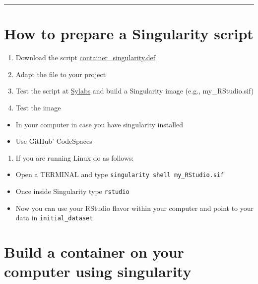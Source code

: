 \documentclass[
  12pt,
]{article}
\providecommand{\tightlist}{%
  \setlength{\itemsep}{0pt}\setlength{\parskip}{0pt}}
\begin{document}
\begin{center}\rule{0.5\linewidth}{0.5pt}\end{center}

\hypertarget{how-to-prepare-a-singularity-script}{%
\section{How to prepare a Singularity
script}\label{how-to-prepare-a-singularity-script}}

\begin{enumerate}
\def\labelenumi{\arabic{enumi}.}
\item
  Download the script
  \href{https://github.com/reisportela/R_Training/tree/master/_containers/container_singularity.def}{container\_singularity.def}
\item
  Adapt the file to your project
\item
  Test the script at \href{https://cloud.sylabs.io/}{Sylabs} and build a
  Singularity image (e.g., my\_RStudio.sif)
\item
  Test the image
\end{enumerate}

\begin{itemize}
\item
  In your computer in case you have singularity installed
\item
  Use GitHub' CodeSpaces
\end{itemize}

\begin{enumerate}
\def\labelenumi{\arabic{enumi}.}
\setcounter{enumi}{5}
\tightlist
\item
  If you are running Linux do as follows:
\end{enumerate}

\begin{itemize}
\item
  Open a TERMINAL and type \texttt{singularity\ shell\ my\_RStudio.sif}
\item
  Once inside Singularity type \texttt{rstudio}
\item
  Now you can use your RStudio flavor within your computer and point to
  your data in \texttt{initial\_dataset}
\end{itemize}

\hypertarget{build-a-container-on-your-computer-using-singularity}{%
\section{Build a container on your computer using
singularity}\label{build-a-container-on-your-computer-using-singularity}}
\end{document}
